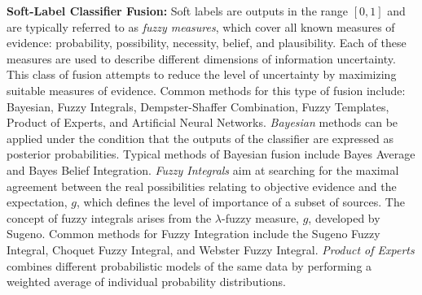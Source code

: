 \documentclass[]{article}
\begin{document}
			\noindent
			\textbf{Soft-Label Classifier Fusion:} \newline
			Soft labels are outputs in the range $[0,1]$ and are typically referred to  as \textit{fuzzy measures}, which cover all known measures of  evidence: probability, possibility, necessity, belief, and plausibility.  Each of these measures are used to describe different dimensions of information uncertainty.  This class of fusion attempts to reduce the level of uncertainty by maximizing suitable measures of evidence.  Common methods for this type of fusion include: Bayesian, Fuzzy Integrals, Dempster-Shaffer Combination, Fuzzy Templates, Product of  Experts, and Artificial Neural Networks.  \textit{Bayesian} methods can be applied under the condition that the outputs of the classifier are expressed as posterior probabilities.  Typical methods of Bayesian fusion include Bayes Average and Bayes Belief Integration. \textit{Fuzzy Integrals} aim at searching for the maximal agreement between  the real possibilities  relating to objective evidence and the expectation, $g$, which defines the level of importance of a subset of sources.  The concept of fuzzy integrals arises from the $\lambda$-fuzzy measure, $g$, developed by Sugeno.  Common methods for Fuzzy Integration include the Sugeno Fuzzy Integral, Choquet Fuzzy Integral, and Webster Fuzzy Integral.  \textit{Product of  Experts} combines different probabilistic models of the same data by performing a weighted average of individual probability distributions. \\
			
			
			
\end{document}
